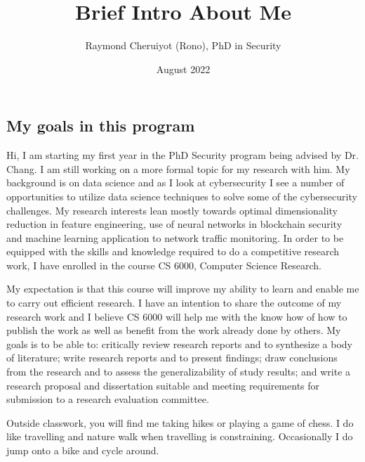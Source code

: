 \documentclass{article}
\title{Brief Intro About Me}
\author{Raymond Cheruiyot (Rono), PhD in Security}
\date{August 2022}
\begin{document}
\maketitle

\begin{multicols}{2}

\section{My goals in this program}
Hi, I am starting my first year in the PhD Security program being advised by Dr. Chang. I am still working on a more formal topic for my research with him. My background is on data science and as I look at cybersecurity I see a number of opportunities to utilize data science techniques to solve some of the cybersecurity challenges. My research interests lean mostly towards optimal dimensionality reduction in feature engineering, use of neural networks in blockchain security and machine learning application to network traffic monitoring. In order to be equipped with the skills and knowledge required to do a competitive research work, I have enrolled in the course CS 6000, Computer Science Research. 

My expectation is that this course will improve my ability to learn and enable me to carry out efficient research. I have an intention to share the outcome of my research work and I believe CS 6000 will help me with the know how of how to publish the work as well as benefit from the work already done by others. My goals is to be able to: critically review research reports and to synthesize a body of literature; write research reports and to present findings; draw conclusions from the research and to assess the generalizability of study results; and write a research proposal and dissertation suitable and meeting requirements for submission to a research evaluation committee.



Outside classwork, you will find me taking hikes or playing a game of chess. I do like travelling and nature walk when travelling is constraining. Occasionally I do jump onto a bike and cycle around.

\end{multicols}
\end{document}
